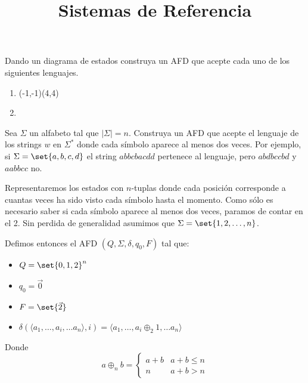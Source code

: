 \documentclass[fcfm]{fcfmcourse}
\title[1]{Sistemas de Referencia}
\begin{document}
\maketitle

\begin{problems}
\problem Dando un diagrama de estados construya un AFD que acepte cada uno de los siguientes lenguajes.

\begin{enumerate}
\item {}
  \begin{solution}
    \begin{VCPicture}{(-1,-1)(4,4)}

    \end{VCPicture}
  \end{solution}
\item {}
\end{enumerate}

\problem Sea $\Sigma$ un alfabeto tal que $|\Sigma|=n$. Construya un AFD que acepte el lenguaje de los strings $w$ en $\Sigma^*$ donde cada símbolo aparece al menos dos veces. Por ejemplo, si $\Sigma=\set{a,b,c,d}$ el string $abbcbacdd$ pertenece al lenguaje, pero $abdbccbd$ y $aabbcc$ no.

\begin{solution}
  Representaremos los estados con $n$-tuplas donde cada posición corresponde a cuantas veces ha sido visto cada símbolo hasta el momento.
  Como sólo es necesario saber si cada símbolo aparece al menos dos veces, paramos de contar en el 2.
  Sin perdida de generalidad asumimos que $\Sigma = \set{1,2,\ldots,n}$.

  Defimos entonces el AFD $(Q, \Sigma, \delta, q_0, F)$ tal que:
  \begin{itemize}
    \item $Q = \set{0,1,2}^n$
    \item $q_0 = \vec{0}$
    \item $F = \set{\vec{2}}$
    \item $\delta(\langle a_1, \ldots, a_i,\ldots a_n \rangle, i) =
           \langle a_1,\ldots, a_i \oplus_2 1, \ldots a_n \rangle$
  \end{itemize}
  Donde 
  \[a \oplus_n b = 
   \begin{cases}
     a + b & a + b \leq n \\
     n & a + b > n
   \end{cases}
  \]
\end{solution}


\end{problems}
\end{document}
